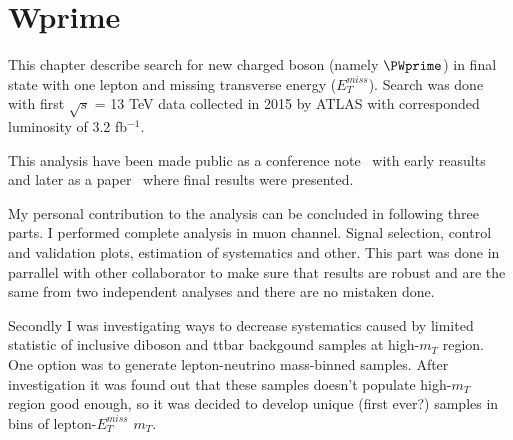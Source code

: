 

\chapter{Wprime}
\label{chap:Wprime}





This chapter describe search for new charged boson (namely $\PWprime$) in final state with one lepton and missing transverse energy ($E_T^{miss}$).
Search was done with first $\sqrt{s}$ = 13 TeV data collected in 2015 by ATLAS with corresponded luminosity of 3.2 fb$^{-1}$.

This analysis have been made public as a conference note~\cite{ATLAS-CONF-2015-063} with early reasults and later as a paper~\cite{Aaboud:2016zkn} where final results were presented.

My personal contribution to the analysis can be concluded in following three parts.
I performed complete analysis in muon channel. Signal selection, control and validation plots, estimation of systematics and other.
This part was done in parrallel with other collaborator to make sure that results are robust and are the same from two independent analyses and there are no mistaken done.

Secondly I was investigating ways to decrease systematics caused by limited statistic of inclusive diboson and ttbar backgound samples at high-$m_{T}$ region.
One option was to generate lepton-neutrino mass-binned samples. After investigation it was found out that these samples doesn't populate high-$m_{T}$ region
good enough, so it was decided to develop unique (first ever?) samples in bins of lepton-$E_T^{miss} $ $m_T$.

